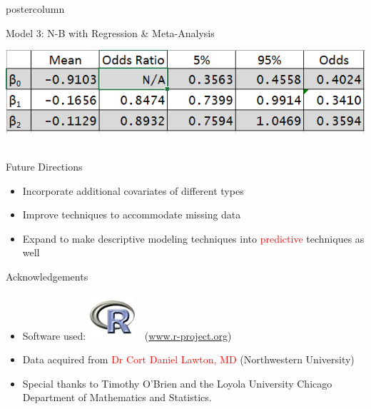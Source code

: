 \documentclass[final]{beamer}\usepackage[]{graphicx}\usepackage[]{color}
\newcommand{\red}{\textcolor{red}}
\begin{document}
{\begin{frame}
\begin{columns}
\begin{column}{.33\textwidth}
\begin{beamercolorbox}[center,wd=\textwidth]{postercolumn}
\begin{minipage}[T]{.97\textwidth}
{\begin{block}{Model 3: N-B with Regression \& Meta-Analysis}
\vspace{1cm}

\centering
\includegraphics[scale=2]{table.png}\ \

\vspace{1cm}
	
\end{block}
\vfill


\begin{block}{Future Directions}
\begin{itemize}
	\item Incorporate additional covariates of different types
	\item Improve techniques to accommodate missing data
	\item Expand to make descriptive modeling techniques into \red{predictive} techniques as well
\end{itemize}



\end{block}
\vfill
\begin{block}{Acknowledgements}


\begin{itemize}
	\item Software used: \includegraphics[scale=.55]{miscPP.png}\ \ (\url{www.r-project.org}) 
	\item Data acquired from \red{Dr Cort Daniel Lawton, MD} (Northwestern University)
	\item Special thanks to Timothy O'Brien and the Loyola University Chicago Department of Mathematics and Statistics.
\end{itemize}



\end{block}





}
\end{minipage}
\end{beamercolorbox}
\end{column}
\end{columns}
\end{frame}}
\end{document}
